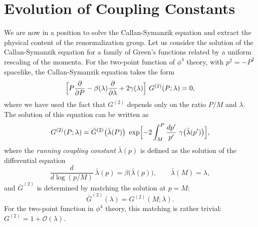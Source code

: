 \section{Evolution of Coupling Constants}

We are now in a position to solve the Callan-Symanzik equation and extract
the physical content of the renormalization group.  Let us consider the
solution of the Callan-Symanzik equation for a family of Green's functions
related by a uniform rescaling of the momenta.  For the two-point function of
$\phi^4$ theory, with $p^2 = -P^2$ spacelike, the Callan-Symanzik equation
takes the form
\begin{equation}
  \Bigl[ P\frac{\partial}{\partial P} - \beta(\lambda)\frac{\partial}
    {\partial\lambda} + 2\gamma(\lambda) \Bigr]\ G^{(2)}(P; \lambda) = 0 ,
  \label{eq:12.70}
\end{equation}
where we have used the fact that $G^{(2)}$ depends only on the ratio
$P/M$ and $\lambda$.  The solution of this equation can be written as
\begin{equation}
  G^{(2)}(P; \lambda) = \bar{G}^{(2)}\bigl( \bar{\lambda}(P) \bigr)\
    \exp\Bigl[ -2\int_{M}^{P} \frac{dp'}{p'}\ \gamma\bigl(
      \bar{\lambda}(p') \bigr) \Bigr] ,
  \label{eq:12.76}
\end{equation}
where the \emph{running coupling constant} $\bar{\lambda}(p)$ is defined as
the solution of the differential equation
\begin{equation}
  \frac{d}{d\log(p/M)}\ \bar{\lambda}(p) = \beta\bigl( \bar{\lambda}(p)
    \bigr),\qquad \bar{\lambda}(M) = \lambda ,
  \label{eq:12.73}
\end{equation}
and $\bar{G}^{(2)}$ is determined by matching the solution at $p = M$:
\begin{equation}
  \bar{G}^{(2)}(\lambda) = G^{(2)}(M; \lambda) .
\end{equation}
For the two-point function in $\phi^4$ theory, this matching is rather
trivial: $G^{(2)} = 1 + \mathcal{O}(\lambda)$.

